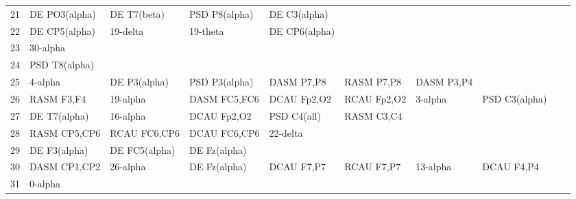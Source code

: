 \begin{landscape}
\begin{table}[]
\begin{tabular}{l|llllllll}
21       & DE PO3(alpha)  & DE T7(beta)    & PSD P8(alpha)  & DE C3(alpha)   &                &                &                &                &               &              \\
22       & DE CP5(alpha)  & 19-delta       & 19-theta       & DE CP6(alpha)  &                &                &                &                &               &              \\
23       & 30-alpha       &                &                &                &                &                &                &                &               &              \\
24       & PSD T8(alpha)  &                &                &                &                &                &                &                &               &              \\
25       & 4-alpha        & DE P3(alpha)   & PSD P3(alpha)  & DASM P7,P8     & RASM P7,P8     & DASM P3,P4     &                &                &               &              \\
26       & RASM F3,F4     & 19-alpha       & DASM FC5,FC6   & DCAU Fp2,O2    & RCAU Fp2,O2    & 3-alpha        & PSD C3(alpha)  &                &               &              \\
27       & DE T7(alpha)   & 16-alpha       & DCAU Fp2,O2    & PSD C4(all)    & RASM C3,C4     &                &                &                &               &              \\
28       & RASM CP5,CP6   & RCAU FC6,CP6   & DCAU FC6,CP6   & 22-delta       &                &                &                &                &               &              \\
29       & DE F3(alpha)   & DE FC5(alpha)  & DE Fz(alpha)   &                &                &                &                &                &               &              \\
30       & DASM CP1,CP2   & 26-alpha       & DE Fz(alpha)   & DCAU F7,P7     & RCAU F7,P7     & 13-alpha       & DCAU F4,P4     &                &               &              \\
31       & 0-alpha        &                &                &                &                &                &                &                &               &              \\
\end{tabular}
\end{table}
\end{landscape}
\clearpage
